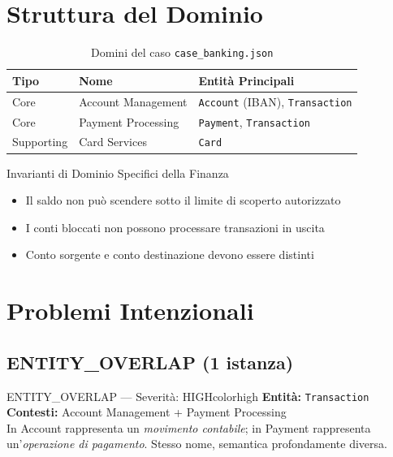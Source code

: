 \documentclass[12pt,a4paper]{report}
\begin{document}
\section{Struttura del Dominio}

\begin{table}[H]
\centering
\renewcommand{\arraystretch}{1.3}
\begin{tabularx}{\textwidth}{l l X}
\toprule
\textbf{Tipo} & \textbf{Nome} & \textbf{Entità Principali} \\
\midrule
Core       & Account Management  & \texttt{Account} (IBAN), \texttt{Transaction} \\
Core       & Payment Processing  & \texttt{Payment}, \texttt{Transaction} \\
Supporting & Card Services       & \texttt{Card} \\
\bottomrule
\end{tabularx}
\caption{Domini del caso \texttt{case\_banking.json}}
\label{tab:bank-domains}
\end{table}

\begin{technicalbox}{Invarianti di Dominio Specifici della Finanza}
\begin{itemize}
  \item Il saldo non può scendere sotto il limite di scoperto autorizzato
  \item I conti bloccati non possono processare transazioni in uscita
  \item Conto sorgente e conto destinazione devono essere distinti
\end{itemize}
\end{technicalbox}
\clearpage
\section{Problemi Intenzionali}

\subsection{ENTITY\_OVERLAP (1 istanza)}

\begin{issuebox}{ENTITY\_OVERLAP --- Severità: HIGH}{colorhigh}
\textbf{Entità:} \texttt{Transaction} \\
\textbf{Contesti:} Account Management + Payment Processing \\
In Account rappresenta un \textit{movimento contabile}; in Payment rappresenta
un'\textit{operazione di pagamento}. Stesso nome, semantica profondamente diversa.
\end{issuebox}
\end{document}
